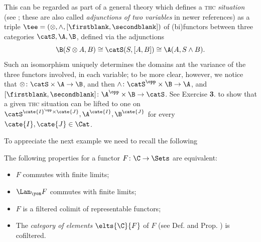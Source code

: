 \begin{remark}\label{tiaccaci}
This can be regarded as part of a general theory which defines a \textsc{thc} \emph{situation} (see \cite[\S \textbf{1.1}]{Gray1980}; these are also called \emph{adjunctions of two variables} in newer references) as a triple $\tee=(\otimes , \wedge, [\firstblank,\secondblank])$ of (bi)functors between three categories $\catS, \A, \B$, defined via the adjunctions
\[
\B(S\otimes A, B)\cong \catS(S, [A,B])\cong \A(A, S\land B).
\] 
Such an isomorphism uniquely determines the domains ant the variance of the three functors involved, in each variable; to be more clear, however, we notice that $\otimes \colon \catS\times \A\to \B$, and then $\land \colon \catS^\opp\times \B\to \A$, and $[\firstblank,\secondblank] \colon \A^\opp\times \B\to \catS$. See Exercise \textbf{3}. to show that a given \textsc{thc} situation can be lifted to one on $\catS^{\cate{I}^\opp\times \cate{J}}, \A^\cate{I}, \B^\cate{J}$ for every $\cate{I},\cate{J}\in\Cat$.
\end{remark}
To appreciate the next example we need to recall the following
\begin{proposition}\label{cofiltness}
The following properties for a functor $F\colon \C\to \Sets$ are equivalent:
\begin{itemize}
\item $F$ commutes with finite limits;
\item $\Lan_\yon F$ commutes with finite limits;
\item $F$ is a filtered colimit of representable functors;
\item The \emph{category of elements} $\elts{\C}{F}$ of $F$ (see Def\@.  and Prop\@. ) is cofiltered.
\end{itemize}
\end{proposition}
